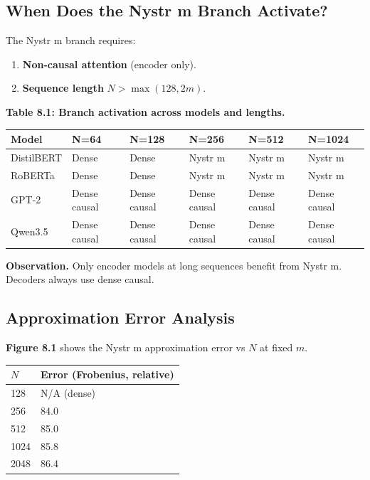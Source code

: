 \subsection{When Does the Nystr m Branch Activate?}

The Nystr m branch requires:

\begin{enumerate}
\item \textbf{Non-causal attention} (encoder only).
\item \textbf{Sequence length} $N > \max(128, 2m)$.

\end{enumerate}
\textbf{Table 8.1: Branch activation across models and lengths.}

\begin{table}[H]
\centering
\small
\begin{tabular}{llllll}
\toprule
\textbf{Model} & \textbf{N=64} & \textbf{N=128} & \textbf{N=256} & \textbf{N=512} & \textbf{N=1024} \\
\midrule
DistilBERT & Dense & Dense & Nystr m & Nystr m & Nystr m \\
RoBERTa & Dense & Dense & Nystr m & Nystr m & Nystr m \\
GPT-2 & Dense causal & Dense causal & Dense causal & Dense causal & Dense causal \\
Qwen3.5 & Dense causal & Dense causal & Dense causal & Dense causal & Dense causal \\
\bottomrule
\end{tabular}
\end{table}

\textbf{Observation.} Only encoder models at long sequences benefit from 
Nystr m. Decoders always use dense causal.

\subsection{Approximation Error Analysis}

\textbf{Figure 8.1} shows the Nystr m approximation error vs $N$ at fixed $m$.

\begin{table}[H]
\centering
\small
\begin{tabular}{ll}
\toprule
\textbf{$N$} & \textbf{Error (Frobenius, relative)} \\
\midrule
128 & N/A (dense) \\
256 & 84.0 \\
512 & 85.0 \\
1024 & 85.8 \\
2048 & 86.4 \\
\bottomrule
\end{tabular}
\end{table}

